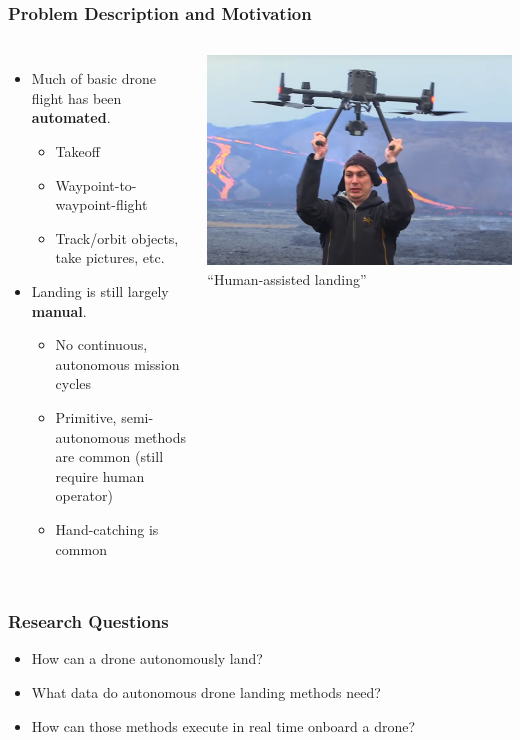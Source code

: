 \documentclass[aspectratio=169]{rubeamer}
\newif\ifpause
\newcommand{\mypause}{\ifpause \pause \fi}
\begin{document}
\begin{frame}
  \frametitle{Problem Description and Motivation}
  \begin{columns}
    \begin{itemize}
      \item Much of basic drone flight has been \textbf{automated}.
      \mypause
      \begin{itemize}
        \item Takeoff
        \item Waypoint-to-waypoint-flight
        \item Track/orbit objects,\\take pictures, etc.
      \end{itemize}
      \mypause
      \item Landing is still largely \textbf{manual}.
      \mypause
      \begin{itemize}
        \item No continuous, autonomous mission cycles
        \item Primitive, semi-autonomous methods are common (still require human operator)
        \item Hand-catching is common
      \end{itemize}
    \end{itemize}
    \centering
    \mypause
    \includegraphics[width=\textwidth]{human_assisted_landing}\\
    ``Human-assisted landing''
  \end{columns}
\end{frame}

\begin{frame}
  \frametitle{Research Questions}
  \begin{itemize}
    \mypause
    \item How can a drone autonomously land?
    \mypause
    \item What data do autonomous drone landing methods need?
    \mypause
    \item How can those methods execute in real time onboard a drone?
  \end{itemize}
\end{frame}
\end{document}
